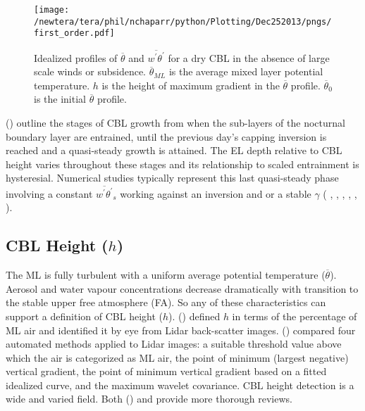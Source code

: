\begin{figure}[htbp]
    \centering
    \texttt{[image: /newtera/tera/phil/nchaparr/python/Plotting/Dec252013/pngs/first\_order.pdf]}
    \caption{Idealized profiles of $\overline{\theta}$ and $\overline{w^{'}\theta^{'}}$ for a dry \acs{CBL} in the absence of large scale winds or subsidence. $\overline{\theta}_{ML}$ is the average mixed layer potential temperature. $h$ is the height of maximum gradient in the $\overline{\theta}$ profile. $\overline{\theta}_{0}$ is the initial $\overline{\theta}$ profile.}
    \label{fig:1storder}   %
\end{figure}

\citeauthor{StullNelEl} (\citeyear{StullNelEl}) outline the stages of \acs{CBL} growth from when the sub-layers of the nocturnal boundary layer are entrained, until the previous day's capping inversion is reached and a quasi-steady growth is attained.  The \acs{EL} depth relative to \acs{CBL} height varies throughout these stages and its relationship to scaled entrainment is hysteresial.  Numerical studies typically represent this last quasi-steady phase involving a constant $\overline{w^{'}\theta^{'}}_{s}$ working against an inversion and or a stable $\gamma$ (\citeauthor{SchmidtSchu} \citeyear{SchmidtSchu}, \citeauthor{Sorbjan} \citeyear{Sorbjan}, \citeauthor{SullMoengStev} \citeyear{SullMoengStev}, \citeauthor{FedConzMir04} \citeyear{FedConzMir04}, \citeauthor{BrooksFowler2} \citeyear{BrooksFowler2}, \citeauthor{GarciaMellado} \citeyear{GarciaMellado}).  

\subsection{CBL Height ($h$)}
\label{subsec:cblh}

The \acs{ML} is fully turbulent with a uniform average potential temperature ($\overline{\theta}$). Aerosol and water vapour concentrations decrease dramatically with transition to the stable upper free atmosphere (\acs{FA}).  So any of these characteristics can support a definition of \acs{CBL} height ($h$).  \citeauthor{StullNelEl} (\citeyear{StullNelEl}) defined $h$ in terms of the percentage of \acs{ML} air and identified it by eye from Lidar back-scatter images.  \citeauthor{Traum11} (\citeyear{Traum11}) compared four automated methods applied to Lidar images: a suitable threshold value above which the air is categorized as \acs{ML} air,  the point of minimum (largest negative) vertical gradient, the point of minimum vertical gradient based on a fitted idealized curve, and the maximum wavelet covariance. \acs{CBL} height detection is a wide and varied field.  Both \citeauthor{BrooksFowler2} (\citeyear{BrooksFowler2}) and \citeauthor{Traum11} \citeyear{Traum11} provide more thorough reviews.\\


